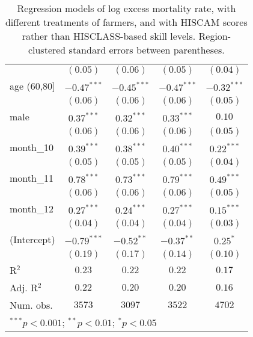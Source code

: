 \begin{table}
\begin{center}
\begin{tabular}{l c c c c}
               & $(0.05)$      & $(0.06)$      & $(0.05)$      & $(0.04)$      \\
age (60,80]    & $-0.47^{***}$ & $-0.45^{***}$ & $-0.47^{***}$ & $-0.32^{***}$ \\
               & $(0.06)$      & $(0.06)$      & $(0.06)$      & $(0.05)$      \\
male           & $0.37^{***}$  & $0.32^{***}$  & $0.33^{***}$  & $0.10$        \\
               & $(0.06)$      & $(0.06)$      & $(0.06)$      & $(0.05)$      \\
month\_10      & $0.39^{***}$  & $0.38^{***}$  & $0.40^{***}$  & $0.22^{***}$  \\
               & $(0.05)$      & $(0.05)$      & $(0.05)$      & $(0.04)$      \\
month\_11      & $0.78^{***}$  & $0.73^{***}$  & $0.79^{***}$  & $0.49^{***}$  \\
               & $(0.06)$      & $(0.06)$      & $(0.06)$      & $(0.05)$      \\
month\_12      & $0.27^{***}$  & $0.24^{***}$  & $0.27^{***}$  & $0.15^{***}$  \\
               & $(0.04)$      & $(0.04)$      & $(0.04)$      & $(0.03)$      \\
(Intercept)    & $-0.79^{***}$ & $-0.52^{**}$  & $-0.37^{**}$  & $0.25^{*}$    \\
               & $(0.19)$      & $(0.17)$      & $(0.14)$      & $(0.10)$      \\
\hline
R$^2$          & $0.23$        & $0.22$        & $0.22$        & $0.17$        \\
Adj. R$^2$     & $0.22$        & $0.20$        & $0.20$        & $0.16$        \\
Num. obs.      & $3573$        & $3097$        & $3522$        & $4702$        \\
\hline
\multicolumn{5}{l}{\scriptsize{$^{***}p<0.001$; $^{**}p<0.01$; $^{*}p<0.05$}}
\end{tabular}
\caption{Regression models of log excess mortality rate, with different treatments of farmers, and with HISCAM scores rather than HISCLASS-based skill levels. Region-clustered standard errors between parentheses.}
\label{tab:altoccmodels}
\end{center}
\end{table}
